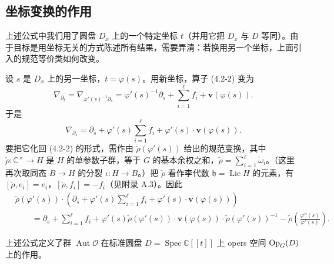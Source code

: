 
\subsection{坐标变换的作用}

上述公式中我们用了圆盘 $D_x$ 上的一个特定坐标 $t$（并用它把 $D_x$ 与 $D$ 等同）。由于目标是用坐标无关的方式陈述所有结果，需要弄清：若换用另一个坐标，上面引入的规范等价类如何改变。

设 $s$ 是 $D_x$ 上的另一坐标，$t=\varphi(s)$。用新坐标，算子 (4.2-2) 变为
\[
    \nabla_{\partial_t}=\nabla_{\varphi'(s)^{-1}\partial_s}=\varphi'(s)^{-1}\partial_s+\sum_{i=1}^{\ell}f_i+\mathbf{v}(\varphi(s)).
\]
于是
\[
    \nabla_{\partial_s}=\partial_s+\varphi'(s)\sum_{i=1}^{\ell}f_i+\varphi'(s)\cdot\mathbf{v}(\varphi(s)).
\]
要把它化回 (4.2-2) 的形式，需作由 $\check{\rho}(\varphi'(s))$ 给出的规范变换，其中 $\check{\rho}:\mathbb{C}^\times\to H$ 是 $H$ 的单参数子群，等于 $G$ 的基本余权之和，$\check{\rho}=\sum_{i=1}^{\ell}\check{\omega}_i$。（这里再次取同态 $B\to H$ 的分裂 $\iota:H\to B$。）把 $\check{\rho}$ 看作李代数 $\mathfrak{h}=\operatorname{Lie}H$ 的元素，有 $[\check{\rho},e_i]=e_i$，$[\check{\rho},f_i]=-f_i$（见附录 A.3）。因此
\begin{align}
    &\check{\rho}(\varphi'(s))\cdot\left(\partial_s+\varphi'(s)\sum_{i=1}^{\ell}f_i+\varphi'(s)\cdot\mathbf{v}(\varphi(s))\right)\nonumber\\
    &\qquad=\partial_s+\sum_{i=1}^{\ell}f_i+\varphi'(s)\check{\rho}(\varphi'(s))\cdot\mathbf{v}(\varphi(s))\cdot\check{\rho}(\varphi'(s))^{-1}-\check{\rho}\left(\frac{\varphi''(s)}{\varphi'(s)}\right).
    \tag{4.2-3}
\end{align}

上述公式定义了群 $\operatorname{Aut}\mathcal{O}$ 在标准圆盘 $D=\operatorname{Spec}\mathbb{C}[[t]]$ 上 opers 空间 $\operatorname{Op}_G(D)$ 上的作用。

